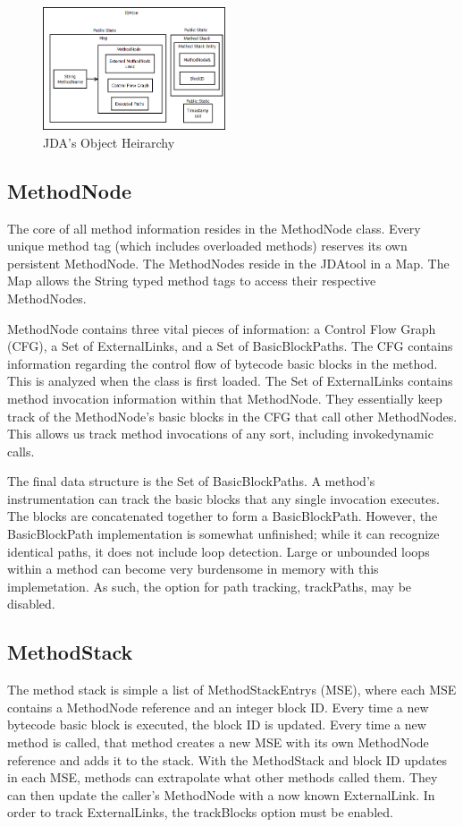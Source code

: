 \documentclass[conference,10pt,twocolumn]{./IEEE/IEEEtran}
\begin{document}
\begin{figure}[t]
  \includegraphics[width=0.48\textwidth]{JDAtool.png}
  \caption{JDA's Object Heirarchy}
  \label{fig:JDAtool}
\end{figure}

\subsection{MethodNode}
The core of all method information resides in the MethodNode class.
Every unique method tag (which includes overloaded methods) reserves its own persistent MethodNode.
The MethodNodes reside in the JDAtool in a Map.
The Map allows the String typed method tags to access their respective MethodNodes.

MethodNode contains three vital pieces of information: a Control Flow Graph (CFG), a Set of ExternalLinks, and a Set of BasicBlockPaths.
The CFG contains information regarding the control flow of bytecode basic blocks in the method.
This is analyzed when the class is first loaded.
The Set of ExternalLinks contains method invocation information within that MethodNode.
They essentially keep track of the MethodNode’s basic blocks in the CFG that call other MethodNodes.
This allows us track method invocations of any sort, including invokedynamic calls.

The final data structure is the Set of BasicBlockPaths.
A method’s instrumentation can track the basic blocks that any single invocation executes.
The blocks are concatenated together to form a BasicBlockPath.
However, the BasicBlockPath implementation is somewhat unfinished; while it can recognize identical paths, it does not include loop detection.
Large or unbounded loops within a method can become very burdensome in memory with this implemetation.
As such, the option for path tracking, trackPaths, may be disabled.

\subsection{MethodStack}
The method stack is simple a list of MethodStackEntrys (MSE), where each MSE contains a MethodNode reference and an integer block ID.  
Every time a new bytecode basic block is executed, the block ID is updated.  
Every time a new method is called, that method creates a new MSE with its own MethodNode reference and adds it to the stack.  
With the MethodStack and block ID updates in each MSE, methods can extrapolate what other methods called them.  
They can then update the caller’s MethodNode with a now known ExternalLink.  
In order to track ExternalLinks, the trackBlocks option must be enabled.
\end{document}
